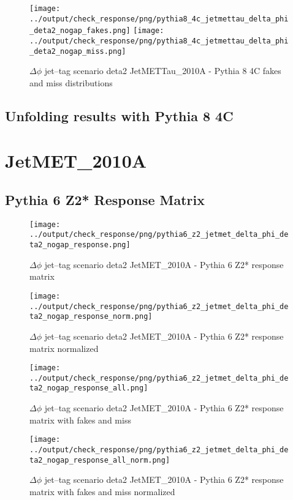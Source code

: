\documentclass[11pt]{book}
\begin{document}
\begin{figure}[ht]
\centering
\texttt{[image: ../output/check\_response/png/pythia8\_4c\_jetmettau\_delta\_phi\_deta2\_nogap\_fakes.png]}
\texttt{[image: ../output/check\_response/png/pythia8\_4c\_jetmettau\_delta\_phi\_deta2\_nogap\_miss.png]}
\caption{$\Delta\phi$ jet--tag scenario deta2 JetMETTau\_2010A - Pythia 8 4C fakes and miss distributions}
\label{p8_jetmettau_delta_phi_deta2_nogap_fakesmiss}
\end{figure}


\clearpage
\subsection{Unfolding results with Pythia 8 4C}


\section{JetMET\_2010A}
\subsection{Pythia 6 Z2* Response Matrix}

\begin{figure}[ht]
\centering
\texttt{[image: ../output/check\_response/png/pythia6\_z2\_jetmet\_delta\_phi\_deta2\_nogap\_response.png]}
\caption{$\Delta\phi$ jet--tag scenario deta2 JetMET\_2010A - Pythia 6 Z2* response matrix}
\label{p6_jetmet_delta_phi_deta2_nogap_response}
\end{figure}

\begin{figure}[ht]
\centering
\texttt{[image: ../output/check\_response/png/pythia6\_z2\_jetmet\_delta\_phi\_deta2\_nogap\_response\_norm.png]}
\caption{$\Delta\phi$ jet--tag scenario deta2 JetMET\_2010A - Pythia 6 Z2* response matrix normalized}
\label{p6_jetmet_delta_phi_deta2_nogap_response_norm}
\end{figure}

\begin{figure}[ht]
\centering
\texttt{[image: ../output/check\_response/png/pythia6\_z2\_jetmet\_delta\_phi\_deta2\_nogap\_response\_all.png]}
\caption{$\Delta\phi$ jet--tag scenario deta2 JetMET\_2010A - Pythia 6 Z2* response matrix with fakes and miss}
\label{p6_jetmet_delta_phi_deta2_nogap_response_all}
\end{figure}

\begin{figure}[ht]
\centering
\texttt{[image: ../output/check\_response/png/pythia6\_z2\_jetmet\_delta\_phi\_deta2\_nogap\_response\_all\_norm.png]}
\caption{$\Delta\phi$ jet--tag scenario deta2 JetMET\_2010A - Pythia 6 Z2* response matrix with fakes and miss normalized}
\label{p6_jetmet_delta_phi_deta2_nogap_response_all_norm}
\end{figure}
\end{document}
